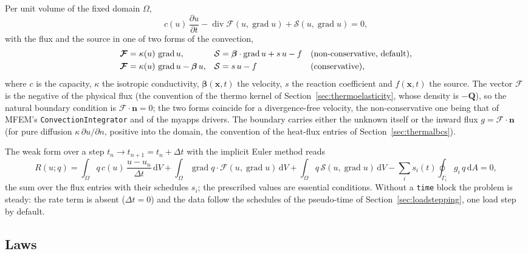 \documentclass[11pt]{article}
\newcommand{\ud}{\,\mathrm{d}}
\newcommand{\grad}{\operatorname{grad}}
\newcommand{\dive}{\operatorname{div}}
\newcommand{\bx}{\bm{x}}
\newcommand{\bn}{\bm{n}}
\newcommand{\bQ}{\bm{Q}}
\DeclareRobustCommand{\code}[1]{{\def\_{\textunderscore\allowbreak}\texttt{#1}}}
\begin{document}
Per unit volume of the fixed domain $\Omega$,
\begin{equation}
  c(u)\,\frac{\partial u}{\partial t} - \dive\bm{\mathcal F}(u, \grad u) + \mathcal S(u, \grad u) = 0,
  \label{eq:scalarstrong}
\end{equation}
with the flux and the source in one of two forms of the convection,
\begin{align}
  \bm{\mathcal F} &= \kappa(u)\,\grad u, & \mathcal S &= \bm\beta\cdot\grad u + s\,u - f
  && \text{(non-conservative, default)}, \notag\\
  \bm{\mathcal F} &= \kappa(u)\,\grad u - \bm\beta\,u, & \mathcal S &= s\,u - f
  && \text{(conservative)},
  \label{eq:scalarforms}
\end{align}
where $c$ is the capacity, $\kappa$ the isotropic conductivity, $\bm\beta(\bx, t)$
the velocity, $s$ the reaction coefficient and $f(\bx, t)$ the source.  The
vector $\bm{\mathcal F}$ is the negative of the physical flux (the
convention of the thermo kernel of Section~\ref{sec:thermoelasticity},
whose density is $-\bQ$), so the natural boundary condition is
$\bm{\mathcal F}\cdot\bn = 0$; the two forms coincide for a
divergence-free velocity, the non-conservative one being that of MFEM's
\code{ConvectionIntegrator} and of the myapps drivers.  The boundary carries
either the unknown itself or the inward flux $g = \bm{\mathcal F}\cdot\bn$
(for pure diffusion $\kappa\,\partial u/\partial n$, positive into the
domain, the convention of the heat-flux entries of Section~\ref{sec:thermalbcs}).

The weak form over a step $t_n \to t_{n+1} = t_n + \Delta t$ with the
implicit Euler method reads
\begin{equation}
  R(u; q) = \int_\Omega q\,c(u)\,\frac{u - u_n}{\Delta t}\ud V
          + \int_\Omega \grad q\cdot\bm{\mathcal F}(u, \grad u)\ud V
          + \int_\Omega q\,\mathcal S(u, \grad u)\ud V
          - \sum_i s_i(t)\oint_{\Gamma_i} g_i\,q\ud A = 0,
  \label{eq:scalarweak}
\end{equation}
the sum over the flux entries with their schedules $s_i$; the prescribed
values are essential conditions.  Without a \code{time} block the problem
is steady: the rate term is absent ($\Delta t = 0$) and the data follow
the schedules of the pseudo-time of Section~\ref{sec:loadstepping}, one
load step by default.

\subsection{Laws}
\end{document}
